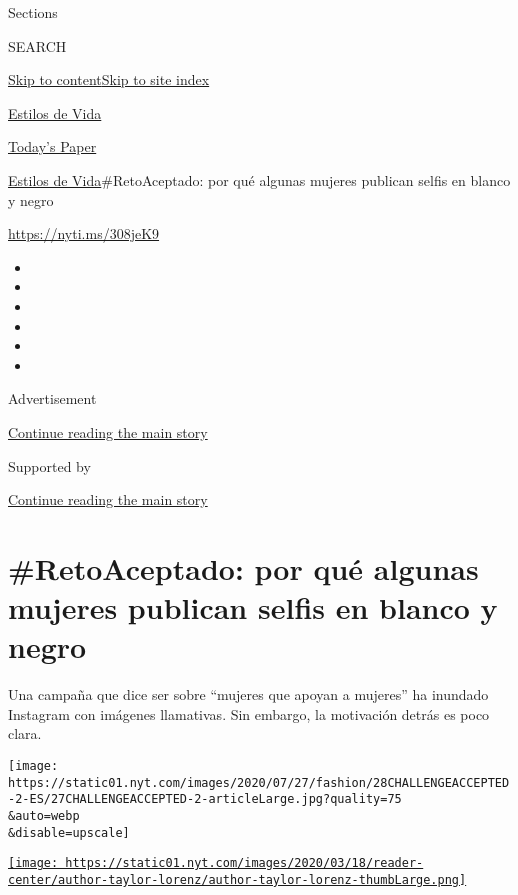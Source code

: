 Sections

SEARCH

\protect\hyperlink{site-content}{Skip to
content}\protect\hyperlink{site-index}{Skip to site index}

\href{https://www.nytimes.com/es/section/estilos-de-vida}{Estilos de
Vida}

\href{https://myaccount.nytimes.com/auth/login?response_type=cookie\&client_id=vi}{}

\href{https://www.nytimes.com/section/todayspaper}{Today's Paper}

\href{/es/section/estilos-de-vida}{Estilos de
Vida}\textbar{}\#RetoAceptado: por qué algunas mujeres publican selfis
en blanco y negro

\url{https://nyti.ms/308jeK9}

\begin{itemize}
\item
\item
\item
\item
\item
\item
\end{itemize}

Advertisement

\protect\hyperlink{after-top}{Continue reading the main story}

Supported by

\protect\hyperlink{after-sponsor}{Continue reading the main story}

\hypertarget{retoaceptado-por-quuxe9-algunas-mujeres-publican-selfis-en-blanco-y-negro}{%
\section{\#RetoAceptado: por qué algunas mujeres publican selfis en
blanco y
negro}\label{retoaceptado-por-quuxe9-algunas-mujeres-publican-selfis-en-blanco-y-negro}}

Una campaña que dice ser sobre ``mujeres que apoyan a mujeres'' ha
inundado Instagram con imágenes llamativas. Sin embargo, la motivación
detrás es poco clara.

\texttt{[image: https://static01.nyt.com/images/2020/07/27/fashion/28CHALLENGEACCEPTED-2-ES/27CHALLENGEACCEPTED-2-articleLarge.jpg?quality=75\\\&auto=webp\\\&disable=upscale]}

\href{https://www.nytimes.com/by/taylor-lorenz}{\texttt{[image: https://static01.nyt.com/images/2020/03/18/reader-center/author-taylor-lorenz/author-taylor-lorenz-thumbLarge.png]}}

